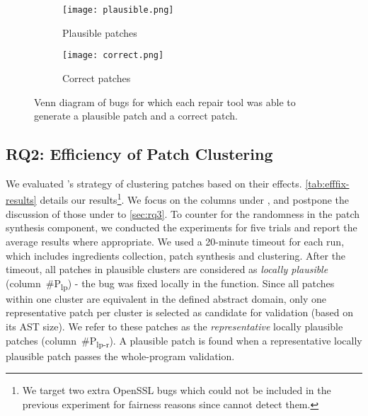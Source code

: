 \begin{figure}[t]
\scriptsize
\centering

\begin{subfigure}[t]{0.47\textwidth}
\centering
\begin{minipage}[t]{0.47\textwidth}
\centering

\texttt{[image: plausible.png]}
\caption{Plausible patches}
\label{fig:venn-plausible}
\end{minipage}\hfill
\begin{minipage}[t]{0.47\textwidth}
\centering

\texttt{[image: correct.png]}
\caption{Correct patches}
\label{fig:venn-correct}
\end{minipage}

\end{subfigure}

\vspace*{-0.05in}
\caption{Venn diagram of bugs for which each repair tool was able to generate a plausible patch and a correct patch.}
\label{fig:venn-comparison}
\end{figure}


\subsection{RQ2: Efficiency of  Patch Clustering}
\label{sec:rq2}



We evaluated \tool's strategy of clustering patches based on their effects.
\autoref{tab:efffix-results} details our results\footnote{\noindent We target two extra OpenSSL bugs which could not be included in the previous experiment for fairness reasons since \footpatch cannot detect them.}. We focus on the columns under \emph{\tool}, and postpone the discussion of those under  \emph{\tooluni}
to \autoref{sec:rq3}.
To counter for the randomness in the patch synthesis component,
we conducted the experiments for five trials and report the average results where appropriate.
We used a 20-minute timeout for each run, which includes ingredients collection, patch synthesis and clustering.
After the timeout, all patches in plausible clusters are considered as \textit{locally plausible}  (column~\#P\textsubscript{lp}) - the bug was fixed locally in the function.
Since all patches within one cluster are equivalent in the defined abstract domain, only 
one representative patch per cluster is selected as 
candidate for validation (based on its AST size).
We refer to these patches as the \textit{representative} locally plausible patches (column~\#P\textsubscript{lp-r}).
A plausible patch is found when a representative locally plausible patch passes the
whole-program validation.

